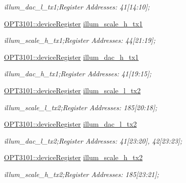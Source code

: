 \begin{DoxyCompactItemize}
\begin{DoxyCompactList}\small\item\em illum\+\_\+dac\+\_\+l\+\_\+tx1;Register Addresses\+: 41\mbox{[}14\+:10\mbox{]}; \end{DoxyCompactList}\item 
\mbox{\hyperlink{class_o_p_t3101_1_1device_register}{O\+P\+T3101\+::device\+Register}} \mbox{\hyperlink{class_o_p_t3101_1_1registers_aa21d0ddf413585c860657ced425be15f}{illum\+\_\+scale\+\_\+h\+\_\+tx1}}
\begin{DoxyCompactList}\small\item\em illum\+\_\+scale\+\_\+h\+\_\+tx1;Register Addresses\+: 44\mbox{[}21\+:19\mbox{]}; \end{DoxyCompactList}\item 
\mbox{\hyperlink{class_o_p_t3101_1_1device_register}{O\+P\+T3101\+::device\+Register}} \mbox{\hyperlink{class_o_p_t3101_1_1registers_af05dedee486d16e110ca46de40b41c71}{illum\+\_\+dac\+\_\+h\+\_\+tx1}}
\begin{DoxyCompactList}\small\item\em illum\+\_\+dac\+\_\+h\+\_\+tx1;Register Addresses\+: 41\mbox{[}19\+:15\mbox{]}; \end{DoxyCompactList}\item 
\mbox{\hyperlink{class_o_p_t3101_1_1device_register}{O\+P\+T3101\+::device\+Register}} \mbox{\hyperlink{class_o_p_t3101_1_1registers_aba9220e6abb4a85a6fba2bc848f347ba}{illum\+\_\+scale\+\_\+l\+\_\+tx2}}
\begin{DoxyCompactList}\small\item\em illum\+\_\+scale\+\_\+l\+\_\+tx2;Register Addresses\+: 185\mbox{[}20\+:18\mbox{]}; \end{DoxyCompactList}\item 
\mbox{\hyperlink{class_o_p_t3101_1_1device_register}{O\+P\+T3101\+::device\+Register}} \mbox{\hyperlink{class_o_p_t3101_1_1registers_a51185e0df51d058ec35728a4a067a075}{illum\+\_\+dac\+\_\+l\+\_\+tx2}}
\begin{DoxyCompactList}\small\item\em illum\+\_\+dac\+\_\+l\+\_\+tx2;Register Addresses\+: 41\mbox{[}23\+:20\mbox{]}, 42\mbox{[}23\+:23\mbox{]}; \end{DoxyCompactList}\item 
\mbox{\hyperlink{class_o_p_t3101_1_1device_register}{O\+P\+T3101\+::device\+Register}} \mbox{\hyperlink{class_o_p_t3101_1_1registers_a01e437455fdcf3e98fa2315da38afb48}{illum\+\_\+scale\+\_\+h\+\_\+tx2}}
\begin{DoxyCompactList}\small\item\em illum\+\_\+scale\+\_\+h\+\_\+tx2;Register Addresses\+: 185\mbox{[}23\+:21\mbox{]}; \end{DoxyCompactList}\item 

\end{DoxyCompactItemize}
